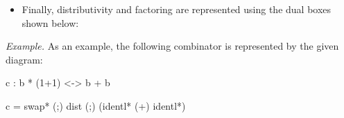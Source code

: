 \documentclass[preprint]{sigplanconf}
\begin{document}
{\begin{itemize}
\item Finally, distributivity and factoring are represented using the dual
  boxes shown below:
\begin{multicols}{2}
\begin{center}
\end{center}
\begin{center}
\end{center}
\end{multicols}

\end{itemize}

\noindent 
\textit{Example.} As an example, the following combinator is represented by
the given diagram:

{{c : b * (1+1) <-> b + b}}

{{c = swap* (;) dist (;) (identl* (+) identl*)}}

\begin{center}
\end{center}




}
\end{document}

